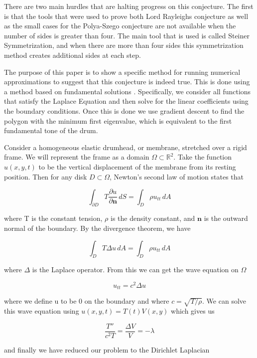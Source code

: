 \documentclass[12pt]{report}
\numberwithin{definition}{section}
\begin{document}
There are two main hurdles that are halting progress on this conjecture.
The first is that the tools that were used to prove both Lord Rayleighs conjecture as well as the small cases for the Polya-Szego conjecture are not available when the number of sides is greater than four.
The main tool that is used is called Steiner Symmetrization, and when there are more than four sides this symmetrization method creates additional sides at each step.

The purpose of this paper is to show a specific method for running numerical approximations to suggest that this conjecture is indeed true.
This is done using a method based on fundamental solutions \cite{code}.
Specifically, we consider all functions that satisfy the Laplace Equation and then solve for the linear coefficients using the boundary conditions.
Once this is done we use gradient descent to find the polygon with the minimum first eigenvalue, which is equivalent to the first fundamental tone of the drum.




Consider a homogeneous elastic drumhead, or membrane, stretched over a rigid frame.
We will represent the frame as a domain $\Omega \subset \mathbb{R}^{2}$.
Take the function $u(x,y,t)$ to be the vertical displacement of the membrane from its resting position.
Then for any disk $D \subset \Omega$, Newton's second law of motion states that

$$ \int_{\partial D} T \frac{\partial u}{\partial \textbf{n}} \, dS = \int_{ D} \rho u_{tt} \, dA $$

where T is the constant tension, $\rho$ is the density constant, and $\textbf{n}$ is the outward normal of the boundary.
By the divergence theorem, we have

$$ \int_{D} T \Delta u \, dA = \int_{D} \rho u_{tt} \, dA $$

where $\Delta$ is the Laplace operator. From this we can get the wave equation on $\Omega$

$$ u_{tt} = c^{2} \Delta u $$

where we define u to be 0 on the boundary and where $c = \sqrt{T / \rho}$.
We can solve this wave equation using $u(x,y,t) = T(t)V(x,y)$ which gives us

$$ \frac{T''}{c^{2}T} = \frac{\Delta V}{V} = - \lambda $$

and finally we have reduced our problem to the Dirichlet Laplacian
\end{document}
